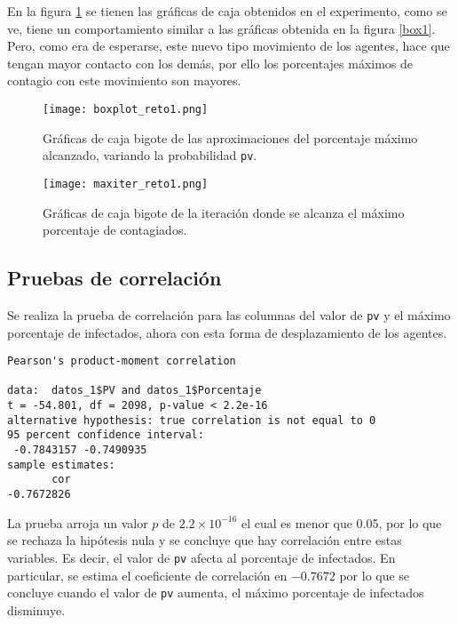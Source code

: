 \documentclass[12pt,letterpaper]{article}
\begin{document}
En la figura \ref{box3} se tienen las gráficas de caja obtenidos en el experimento, como se ve, tiene un comportamiento similar a las gráficas obtenida en la figura \ref{box1}. Pero, como era de esperarse, este nuevo tipo movimiento de los agentes, hace que tengan mayor contacto con los demás, por ello los porcentajes máximos de contagio con este movimiento son mayores.
\begin{figure}
	\centering
	\texttt{[image: boxplot\_reto1.png]}
	\caption{Gráficas de caja bigote de las aproximaciones del porcentaje máximo alcanzado, variando la probabilidad \texttt{pv}.}
	\label{box3}
\end{figure}

\begin{figure}
	\centering
	\texttt{[image: maxiter\_reto1.png]}
	\caption{Gráficas de caja bigote de la iteración donde se alcanza el máximo porcentaje de contagiados.}
	\label{box4}
\end{figure}

\subsection{Pruebas de correlación}
Se realiza la prueba de correlación para las columnas del valor de \texttt{pv} y el máximo porcentaje de infectados, ahora con esta forma de desplazamiento de los agentes.
\begin{verbatim}
Pearson's product-moment correlation

data:  datos_1$PV and datos_1$Porcentaje
t = -54.801, df = 2098, p-value < 2.2e-16
alternative hypothesis: true correlation is not equal to 0
95 percent confidence interval:
 -0.7843157 -0.7490935
sample estimates:
       cor 
-0.7672826
\end{verbatim}
La prueba arroja un valor $p$ de $2.2\times 10^{-16}$ el cual es menor que 0.05, por lo que se rechaza la hipótesis nula y se concluye que hay correlación entre estas variables. Es decir, el valor de \texttt{pv} afecta al porcentaje de infectados. En particular, se estima el coeficiente de correlación en $-0.7672$ por lo que se concluye cuando el valor de \texttt{pv} aumenta, el máximo porcentaje de infectados disminuye. 
 

\end{document}
